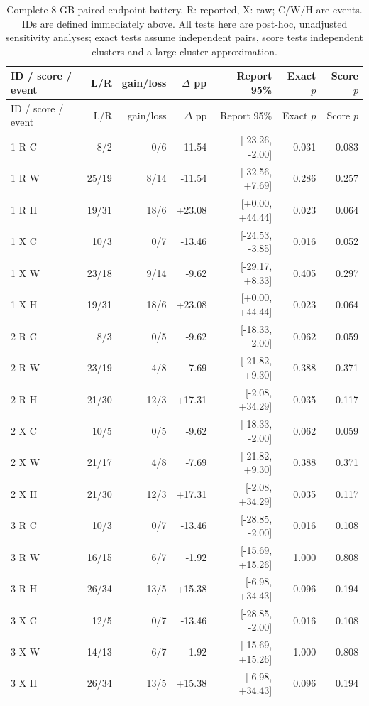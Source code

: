 {\small\setlength{\tabcolsep}{3pt}\begin{longtable}{lrrrrrr}
\caption{Complete 8 GB paired endpoint battery. R: reported, X: raw; C/W/H are events. IDs are defined immediately above. All tests here are post-hoc, unadjusted sensitivity analyses; exact tests assume independent pairs, score tests independent clusters and a large-cluster approximation.}\label{tab:battery-tier8}\\
ID / score / event & L/R & gain/loss & $\Delta$ pp & Report 95\% & Exact $p$ & Score $p$\\\toprule\endfirsthead
ID / score / event & L/R & gain/loss & $\Delta$ pp & Report 95\% & Exact $p$ & Score $p$\\\toprule\endhead
1 R C & 8/2 & 0/6 & -11.54 & [-23.26, -2.00] & 0.031 & 0.083\\
1 R W & 25/19 & 8/14 & -11.54 & [-32.56, +7.69] & 0.286 & 0.257\\
1 R H & 19/31 & 18/6 & +23.08 & [+0.00, +44.44] & 0.023 & 0.064\\
1 X C & 10/3 & 0/7 & -13.46 & [-24.53, -3.85] & 0.016 & 0.052\\
1 X W & 23/18 & 9/14 & -9.62 & [-29.17, +8.33] & 0.405 & 0.297\\
1 X H & 19/31 & 18/6 & +23.08 & [+0.00, +44.44] & 0.023 & 0.064\\
2 R C & 8/3 & 0/5 & -9.62 & [-18.33, -2.00] & 0.062 & 0.059\\
2 R W & 23/19 & 4/8 & -7.69 & [-21.82, +9.30] & 0.388 & 0.371\\
2 R H & 21/30 & 12/3 & +17.31 & [-2.08, +34.29] & 0.035 & 0.117\\
2 X C & 10/5 & 0/5 & -9.62 & [-18.33, -2.00] & 0.062 & 0.059\\
2 X W & 21/17 & 4/8 & -7.69 & [-21.82, +9.30] & 0.388 & 0.371\\
2 X H & 21/30 & 12/3 & +17.31 & [-2.08, +34.29] & 0.035 & 0.117\\
3 R C & 10/3 & 0/7 & -13.46 & [-28.85, -2.00] & 0.016 & 0.108\\
3 R W & 16/15 & 6/7 & -1.92 & [-15.69, +15.26] & 1.000 & 0.808\\
3 R H & 26/34 & 13/5 & +15.38 & [-6.98, +34.43] & 0.096 & 0.194\\
3 X C & 12/5 & 0/7 & -13.46 & [-28.85, -2.00] & 0.016 & 0.108\\
3 X W & 14/13 & 6/7 & -1.92 & [-15.69, +15.26] & 1.000 & 0.808\\
3 X H & 26/34 & 13/5 & +15.38 & [-6.98, +34.43] & 0.096 & 0.194\\

\end{longtable}}
